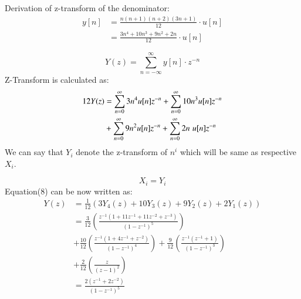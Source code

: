 \documentclass[journal,12pt,twocolumn]{IEEEtran}
\theoremstyle{remark}
\begin{document}
\begin{enumerate}[label=\alph*)]
Derivation of z-transform of the denominator:
\begin{align*}
    y[n] &= \frac{n(n+1)(n+2)(3n+1)}{12}\cdot u[n]\\
         &= \frac{3n^4 + 10n^3 + 9n^2 + 2n}{12}\cdot u[n]\
\end{align*}

\begin{equation}
    Y(z) = \sum_{n=-\infty}^\infty y[n]\cdot z^{-n}
\end{equation}
Z-Transform is calculated as:
\begin{align}
    12Y(z) &= \sum_{n=0}^\infty 3n^4u[n]z^{-n} +  \sum_{n=0}^\infty 10n^3u[n]z^{-n}\\ &+  \sum_{n=0}^\infty 9n^2u[n] z^{-n} +\sum_{n=0}^\infty 2n\hspace{3pt}u[n]z^{-n}\notag
\end{align}
We can say that $Y_i$ denote the z-transform of $n^{i}$ which will be same as respective $X_i$.

$$X_i=Y_i$$
Equation(8) can be now written as:
\begin{align*}
    Y(z) &=\frac{1}{12}(3Y_4(z) + 10Y_3(z) + 9Y_2(z) + 2Y_1(z)) \\
         &= \frac{3}{12}\left(\frac{z^{-1}(1+11z^{-1}+11z^{-2}+z^{-3})}{(1-z^{-1})^5}\right)\\ &+ \frac{10}{12}\left(\frac{z^{-1}(1+4z^{-1}+z^{-2})}{(1-z^{-1})^4}\right) 
         + \frac{9}{12}\left(\frac{z^{-1}(z^{-1}+1)}{(1-z^{-1})^3}\right)\\ &+ \frac{2}{12}\left(\frac{z}{(z - 1)^2}\right) \\
         &= \frac{2(z^{-1}+2z^{-2})}{(1-z^{-1})^5}
\end{align*}
\end{enumerate}
\end{document}
